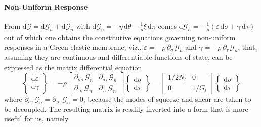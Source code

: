 \paragraph{Non-Uniform Response}

From $\mathrm{d} \mathcal{G} = \mathrm{d} \mathcal{G}_u + \mathrm{d} \mathcal{G}_n$ with $\mathrm{d} \mathcal{G}_u = -\eta \, \mathrm{d} \theta - \tfrac{1}{\rho} \xi \, \mathrm{d} \pi$ comes $\mathrm{d} \mathcal{G}_n = -\tfrac{1}{\rho} ( \varepsilon \, \mathrm{d} \sigma + \gamma \, \mathrm{d} \tau )$ out of which one obtains the constitutive equations governing non-uniform responses in a Green elastic membrane, viz., $\varepsilon = -\rho \, \partial_{\sigma\,} \mathcal{G}_n$ and $\gamma = -\rho \, \partial_{\tau\,} \mathcal{G}_n$, that, assuming they are continuous and differentiable functions of state, can be expressed as the matrix differential equation
\begin{displaymath}
\left\{ \begin{matrix}
\mathrm{d} \varepsilon \\ \mathrm{d} \gamma
\end{matrix} \right\} = -\rho \begin{bmatrix}
\partial_{\sigma\sigma\,} \mathcal{G}_n & 
\partial_{\sigma\tau\,} \mathcal{G}_n \\
\partial_{\tau\sigma\,} \mathcal{G}_n &
\partial_{\tau\tau\,} \mathcal{G}_n
\end{bmatrix}
\left\{ \begin{matrix}  
\mathrm{d} \sigma \\ \mathrm{d} \tau
\end{matrix} \right\} = \begin{bmatrix}
1/2 N_t & 0 \\ 
0 & 1 / G_t
\end{bmatrix} \left\{ \begin{matrix}
\mathrm{d} \sigma \\ \mathrm{d} \tau
\end{matrix} \right\}
\end{displaymath}
where $\partial_{\sigma\tau\,} \mathcal{G}_n = \partial_{\tau\sigma\,} \mathcal{G}_n = 0$, because the modes of squeeze and shear are taken to be decoupled.  The resulting matrix is readily inverted into a form that is more useful for us, namely
